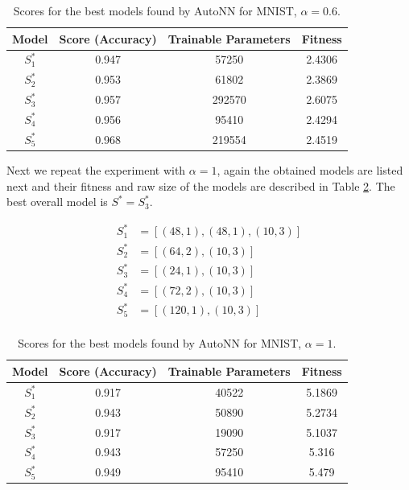 \documentclass[journal]{IEEEtran}
\begin{document}
\begin{table}[!htb]
\begin{center}
\begin{tabular}{| c | c | c | c |}
\hline
Model & Score (Accuracy) & Trainable Parameters & Fitness\\
\hline
$S^*_1$ & 0.947 & 57250 & 2.4306\\
$S^*_2$ & 0.953 & 61802 & 2.3869\\
$S^*_3$ & 0.957 & 292570 & 2.6075\\
$S^*_4$ & 0.956 & 95410 & 2.4294\\
$S^*_5$ & 0.968 & 219554 & 2.4519\\
\hline
\end{tabular}
\end{center}
\caption{Scores for the best models found by AutoNN for MNIST, $\alpha = 0.6$.}
\label{table:autonn_mnist_2}
\end{table}

Next we repeat the experiment with $\alpha = 1$, again the obtained models are listed next and their fitness and raw size of the models are described in Table \ref{table:autonn_mnist_3}. The best overall model is $S^* = S^*_3$.

\begin{align*}
S^*_1 & = \left[ (48, 1), (48,1), (10, 3) \right] \\
S^*_2 & = \left[ (64, 2), (10, 3) \right] \\
S^*_3 & = \left[ (24, 1), (10, 3) \right] \\
S^*_4 & = \left[ (72, 2),  (10, 3) \right] \\
S^*_5 & = \left[ (120, 1),  (10, 3) \right] \\
\end{align*}

\begin{table}[!htb]
\begin{center}
\begin{tabular}{| c | c | c | c |}
\hline
Model & Score (Accuracy) & Trainable Parameters & Fitness\\
\hline
$S^*_1$ & 0.917 & 40522 & 5.1869\\
$S^*_2$ & 0.943 & 50890 & 5.2734\\
$S^*_3$ & 0.917 & 19090 & 5.1037\\
$S^*_4$ & 0.943 & 57250 & 5.316\\
$S^*_5$ & 0.949 & 95410 & 5.479\\
\hline
\end{tabular}
\end{center}
\caption{Scores for the best models found by AutoNN for MNIST, $\alpha = 1$.}
\label{table:autonn_mnist_3}
\end{table}
\end{document}
